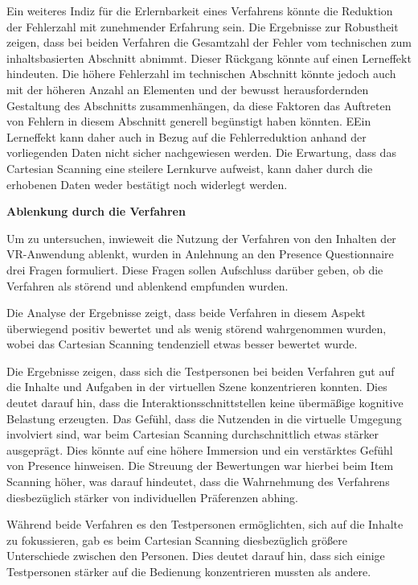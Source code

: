 Ein weiteres Indiz für die Erlernbarkeit eines Verfahrens könnte die Reduktion der Fehlerzahl mit zunehmender Erfahrung sein. Die Ergebnisse zur Robustheit zeigen, dass bei beiden Verfahren die Gesamtzahl der Fehler vom technischen zum inhaltsbasierten Abschnitt abnimmt. Dieser Rückgang könnte auf einen Lerneffekt hindeuten. Die höhere Fehlerzahl im technischen Abschnitt könnte jedoch auch mit der höheren Anzahl an Elementen und der bewusst herausfordernden Gestaltung des Abschnitts zusammenhängen, da diese Faktoren das Auftreten von Fehlern in diesem Abschnitt generell begünstigt haben könnten. EEin Lerneffekt kann daher auch in Bezug auf die Fehlerreduktion anhand der vorliegenden Daten nicht sicher nachgewiesen werden. Die Erwartung, dass das Cartesian Scanning eine steilere Lernkurve aufweist, kann daher durch die erhobenen Daten weder bestätigt noch widerlegt werden.

\textbf{Ablenkung durch die Verfahren}

Um zu untersuchen, inwieweit die Nutzung der Verfahren von den Inhalten der VR-Anwendung ablenkt, wurden in Anlehnung an den Presence Questionnaire \citep{witmer_measuring_1998} drei Fragen formuliert. Diese Fragen sollen Aufschluss darüber geben, ob die Verfahren als störend und ablenkend empfunden wurden. 

Die Analyse der Ergebnisse zeigt, dass beide Verfahren in diesem Aspekt überwiegend positiv bewertet und als wenig störend wahrgenommen wurden, wobei das Cartesian Scanning tendenziell etwas besser bewertet wurde.

Die Ergebnisse zeigen, dass sich die Testpersonen bei beiden Verfahren gut auf die Inhalte und Aufgaben in der virtuellen Szene konzentrieren konnten. Dies deutet darauf hin, dass die Interaktionsschnittstellen keine übermäßige kognitive Belastung erzeugten. Das Gefühl, dass die Nutzenden in die virtuelle Umgegung involviert sind, war beim Cartesian Scanning durchschnittlich etwas stärker ausgeprägt. Dies könnte auf eine höhere Immersion und ein verstärktes Gefühl von Presence hinweisen. Die Streuung der Bewertungen war hierbei beim Item Scanning höher, was darauf hindeutet, dass die Wahrnehmung des Verfahrens diesbezüglich stärker von individuellen Präferenzen abhing.

Während beide Verfahren es den Testpersonen ermöglichten, sich auf die Inhalte zu fokussieren, gab es beim Cartesian Scanning diesbezüglich größere Unterschiede zwischen den Personen. Dies deutet darauf hin, dass sich einige Testpersonen stärker auf die Bedienung konzentrieren mussten als andere. 

